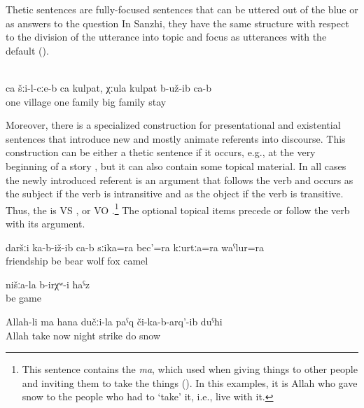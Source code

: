 Thetic sentences are fully-focused sentences that can be uttered out of the blue or as answers to the question  In Sanzhi, they have the same structure with respect to the division of the utterance into topic and focus as utterances with the default   ().
%
\begin{exe}
	\\\label{ex:‎‎In one village there lived a family, a big family}%
	\gll	ca	šːi-l-cːe-b	ca	kulpat,		χːula	kulpat	b-už-ib	ca-b\\
		one	village	one	family	big	family	stay	\\
	\glt	{}
\end{exe}

Moreover, there is a specialized construction for presentational and existential sentences that introduce new and mostly animate referents into discourse. This construction can be either a thetic sentence if it occurs, e.g., at the very beginning of a story , but it can also contain some topical material. In all cases the newly introduced referent is an argument that follows the verb and occurs as the subject if the verb is intransitive and as the object if the verb is transitive. Thus, the  is VS ,  or VO .\footnote{This sentence contains the  \textit{ma}, which used when giving things to other people and inviting them to take the things (). In this examples, it is Allah who gave snow to the people who had to `take' it, i.e., live with it.} The optional topical items precede or follow the verb with its argument.
%
\begin{exe}
	\ex	\label{ex:‎‎The bear, the wolf, the fox, and the camel were friends}
	\gll	daršːi	ka-b-iž-ib	ca-b	sːika=ra	bec'=ra	 kːurtːa=ra	waˁlur=ra\\
		friendship	be		bear\tsc{=add}	wolf	fox camel\\
	\glt	{}

	\ex	\label{ex:We had a game}
	\gll	nišːa-la	b-irχʷ-i	ħaˁz\\
			be	game\\
	\glt	{}

	\ex	\label{ex:Allah sent snow during the night}
	\gll	Allah-li	ma	hana	dučːi-la	paˁq	či-ka-b-arq'-ib	duˁħi\\
		Allah	take	now	night	strike	do	snow\\
	\glt	{}
\end{exe}



